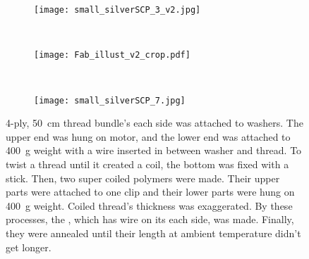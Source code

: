 \begin{figure}[b]
	\centering
	\begin{subfigure}{.15\linewidth}
		\centering\texttt{[image: small\_silverSCP\_3\_v2.jpg]}
		\caption{\label{silverSCP_2}}
	\end{subfigure}
	~
	\begin{subfigure}{.45\linewidth}
		\centering\texttt{[image: Fab\_illust\_v2\_crop.pdf]}
		\caption{\label{silverSCP_illust}}
	\end{subfigure}
	~
	\begin{subfigure}{.15\linewidth}
		\centering\texttt{[image: small\_silverSCP\_7.jpg]}
		\caption{\label{silverSCP_annealing}}
	\end{subfigure}
	\caption[Process of making \scps with silver-painted nylon thread]{ 4-ply, \SI{50}{\centi\meter} thread bundle's each side was attached to washers. The upper end was hung on motor, and the lower end was attached to \SI{400}{\gram} weight with a wire inserted in between washer and thread.  To twist a thread until it created a coil, the bottom was fixed with a stick. Then, two super coiled polymers were made. Their upper parts were attached to one clip and their lower parts were hung on \SI{400}{\gram} weight. Coiled thread's thickness was exaggerated.  By these processes, the \scpnospace, which has wire on its each side, was made. Finally, they were annealed until their length at ambient temperature didn't get longer.}
	\label{silverSCP_makingof}
\end{figure}



